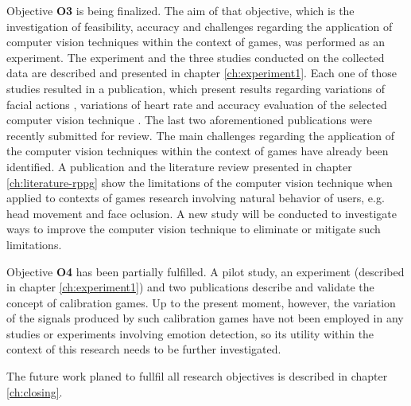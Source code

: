 Objective \textbf{O3} is being finalized. The aim of that objective, which is the investigation of feasibility, accuracy and challenges regarding the application of computer vision techniques within the context of games, was performed as an experiment. The experiment and the three studies conducted on the collected data are described and presented in chapter \ref{ch:experiment1}. Each one of those studies resulted in a publication, which present results regarding variations of facial actions \parencite{bevilacqua2016variations}, variations of heart rate \parencite{bevilacqua2017changes} and accuracy evaluation of the selected computer vision technique \parencite{bevilacqua2017accuracy}. The last two aforementioned publications were recently submitted for review. The main challenges regarding the application of the computer vision techniques within the context of games have already been identified. A publication \parencite{bevilacqua2017accuracy} and the literature review presented in chapter \ref{ch:literature-rppg} show the limitations of the computer vision technique when applied to contexts of games research involving natural behavior of users, e.g. head movement and face oclusion. A new study will be conducted to investigate ways to improve the computer vision technique to eliminate or mitigate such limitations.

Objective \textbf{O4} has been partially fulfilled. A pilot study, an experiment (described in chapter \ref{ch:experiment1}) and two publications \parencite{bevilacqua2016variations,bevilacqua2017changes} describe and validate the concept of calibration games. Up to the present moment, however, the variation of the signals produced by such calibration games have not been employed in any studies or experiments involving emotion detection, so its utility within the context of this research needs to be further investigated.

The future work planed to fullfil all research objectives is described in chapter \ref{ch:closing}.
